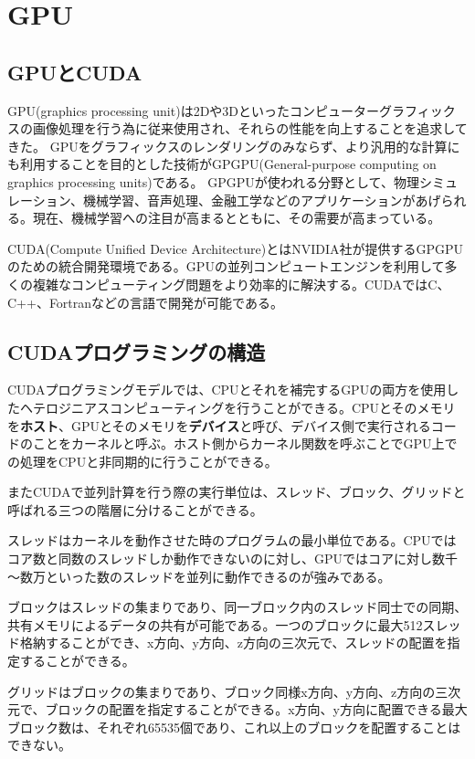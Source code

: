 \documentclass[a4paper,11pt,oneside,openany]{jsbook}
\begin{document}
\section{GPU}
\subsection{GPUとCUDA}
GPU(graphics processing unit)は2Dや3Dといったコンピューターグラフィックスの画像処理を行う為に従来使用され、それらの性能を向上することを追求してきた。
GPUをグラフィックスのレンダリングのみならず、より汎用的な計算にも利用することを目的とした技術がGPGPU(General-purpose computing on graphics processing units)である。
GPGPUが使われる分野として、物理シミュレーション、機械学習、音声処理、金融工学などのアプリケーションがあげられる。現在、機械学習への注目が高まるとともに、その需要が高まっている。

CUDA(Compute Unified Device Architecture)とはNVIDIA社が提供するGPGPUのための統合開発環境である。GPUの並列コンピュートエンジンを利用して多くの複雑なコンピューティング問題をより効率的に解決する。CUDAではC、C++、Fortranなどの言語で開発が可能である。

\subsection{CUDAプログラミングの構造}
CUDAプログラミングモデルでは、CPUとそれを補完するGPUの両方を使用したヘテロジニアスコンピューティングを行うことができる。CPUとそのメモリを{\bf ホスト}、GPUとそのメモリを{\bf デバイス}と呼び、デバイス側で実行されるコードのことをカーネルと呼ぶ。ホスト側からカーネル関数を呼ぶことでGPU上での処理をCPUと非同期的に行うことができる。

またCUDAで並列計算を行う際の実行単位は、スレッド、ブロック、グリッドと呼ばれる三つの階層に分けることができる。

スレッドはカーネルを動作させた時のプログラムの最小単位である。CPUではコア数と同数のスレッドしか動作できないのに対し、GPUではコアに対し数千～数万といった数のスレッドを並列に動作できるのが強みである。

ブロックはスレッドの集まりであり、同一ブロック内のスレッド同士での同期、共有メモリによるデータの共有が可能である。一つのブロックに最大512スレッド格納することができ、x方向、y方向、z方向の三次元で、スレッドの配置を指定することができる。

グリッドはブロックの集まりであり、ブロック同様x方向、y方向、z方向の三次元で、ブロックの配置を指定することができる。x方向、y方向に配置できる最大ブロック数は、それぞれ65535個であり、これ以上のブロックを配置することはできない。
\end{document}
